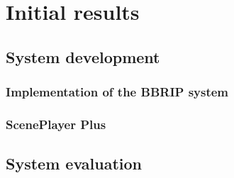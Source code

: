 \section{Initial results}

\subsection{System development}

\subsubsection{Implementation of the BBRIP system}

\subsubsection{ScenePlayer Plus}

\subsection{System evaluation}

